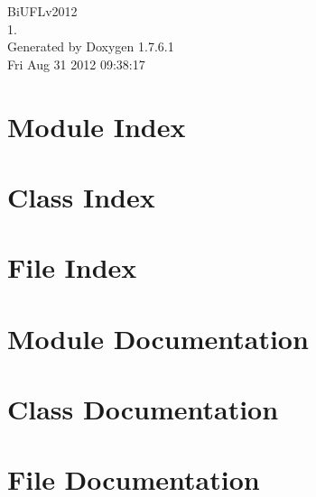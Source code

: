 \documentclass[a4paper]{book}
\begin{document}
\hypersetup{pageanchor=false,citecolor=blue}
\begin{titlepage}
\vspace*{7cm}
\begin{center}
{\Large \-Bi\-U\-F\-Lv2012 \\[1ex]\large 1. }\\
\vspace*{1cm}
{\large \-Generated by Doxygen 1.7.6.1}\\
\vspace*{0.5cm}
{\small Fri Aug 31 2012 09:38:17}\\
\end{center}
\end{titlepage}
\clearemptydoublepage
{}
\tableofcontents
\clearemptydoublepage
{}
\hypersetup{pageanchor=true,citecolor=blue}
\chapter{\-Module \-Index}

\chapter{\-Class \-Index}

\chapter{\-File \-Index}

\chapter{\-Module \-Documentation}





\chapter{\-Class \-Documentation}









\chapter{\-File \-Documentation}





















\printindex
\end{document}
